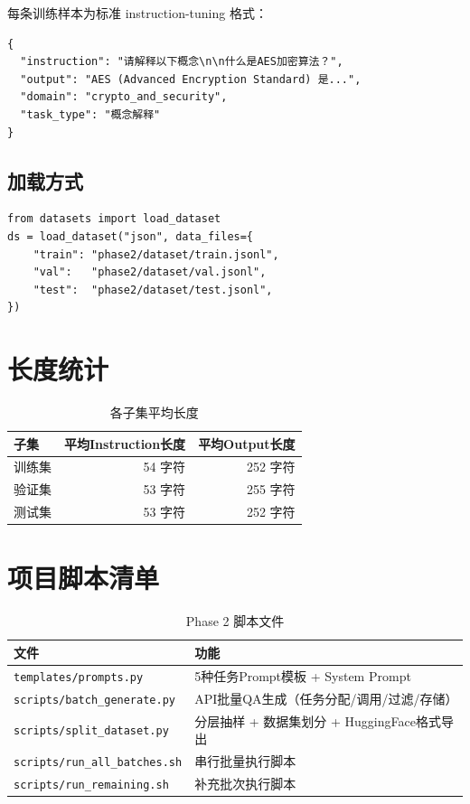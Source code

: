 \documentclass[12pt,a4paper]{ctexart}
\begin{document}
每条训练样本为标准 instruction-tuning 格式：

\begin{verbatim}
{
  "instruction": "请解释以下概念\n\n什么是AES加密算法？",
  "output": "AES (Advanced Encryption Standard) 是...",
  "domain": "crypto_and_security",
  "task_type": "概念解释"
}
\end{verbatim}

\subsection{加载方式}

\begin{verbatim}
from datasets import load_dataset
ds = load_dataset("json", data_files={
    "train": "phase2/dataset/train.jsonl",
    "val":   "phase2/dataset/val.jsonl",
    "test":  "phase2/dataset/test.jsonl",
})
\end{verbatim}

\section{长度统计}

\begin{table}[htbp]\centering
\caption{各子集平均长度}
\begin{tabular}{@{}lrr@{}}
\toprule
\textbf{子集} & \textbf{平均Instruction长度} & \textbf{平均Output长度} \\
\midrule
训练集 & 54 字符 & 252 字符 \\
验证集 & 53 字符 & 255 字符 \\
测试集 & 53 字符 & 252 字符 \\
\bottomrule
\end{tabular}
\end{table}

\section{项目脚本清单}

\begin{table}[htbp]\centering
\caption{Phase 2 脚本文件}
\small
\begin{tabular}{@{}ll@{}}
\toprule
\textbf{文件} & \textbf{功能} \\
\midrule
\texttt{templates/prompts.py}        & 5种任务Prompt模板 + System Prompt \\
\texttt{scripts/batch\_generate.py}  & API批量QA生成（任务分配/调用/过滤/存储） \\
\texttt{scripts/split\_dataset.py}   & 分层抽样 + 数据集划分 + HuggingFace格式导出 \\
\texttt{scripts/run\_all\_batches.sh}& 串行批量执行脚本 \\
\texttt{scripts/run\_remaining.sh}   & 补充批次执行脚本 \\
\bottomrule
\end{tabular}
\end{table}
\end{document}
